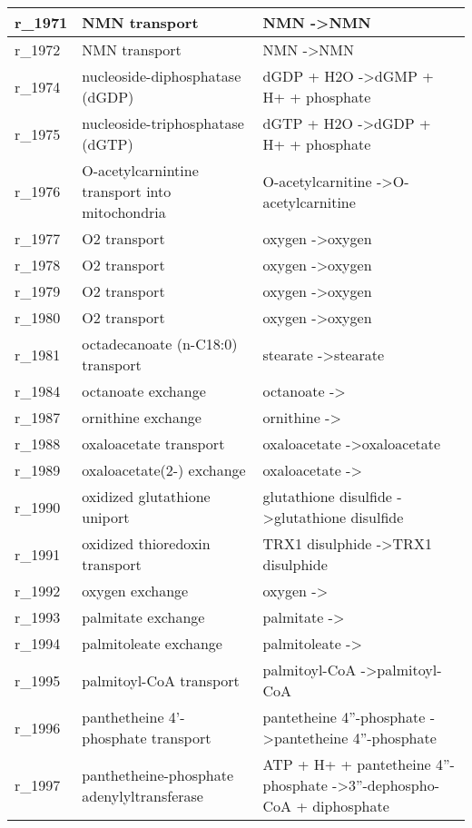 \begin{landscape}
{\begin{longtable}{|l|p{7cm}|p{15cm}|}
r\_1971 & NMN transport & NMN  -\textgreater NMN \\ \hline
r\_1972 & NMN transport & NMN  -\textgreater NMN \\ \hline
r\_1974 & nucleoside-diphosphatase (dGDP) & dGDP + H2O  -\textgreater dGMP + H+ + phosphate \\ \hline
r\_1975 & nucleoside-triphosphatase (dGTP) & dGTP + H2O  -\textgreater dGDP + H+ + phosphate \\ \hline
r\_1976 & O-acetylcarnintine transport into mitochondria & O-acetylcarnitine  -\textgreater O-acetylcarnitine \\ \hline
r\_1977 & O2 transport & oxygen  -\textgreater oxygen \\ \hline
r\_1978 & O2 transport & oxygen  -\textgreater oxygen \\ \hline
r\_1979 & O2 transport & oxygen  -\textgreater oxygen \\ \hline
r\_1980 & O2 transport & oxygen  -\textgreater oxygen \\ \hline
r\_1981 & octadecanoate (n-C18:0) transport & stearate  -\textgreater stearate \\ \hline
r\_1984 & octanoate exchange & octanoate  -\textgreater{} \\ \hline
r\_1987 & ornithine exchange & ornithine  -\textgreater{} \\ \hline
r\_1988 & oxaloacetate transport & oxaloacetate  -\textgreater oxaloacetate \\ \hline
r\_1989 & oxaloacetate(2-) exchange & oxaloacetate  -\textgreater{} \\ \hline
r\_1990 & oxidized glutathione uniport & glutathione disulfide  -\textgreater glutathione disulfide \\ \hline
r\_1991 & oxidized thioredoxin transport & TRX1 disulphide  -\textgreater TRX1 disulphide \\ \hline
r\_1992 & oxygen exchange & oxygen  -\textgreater{} \\ \hline
r\_1993 & palmitate exchange & palmitate  -\textgreater{} \\ \hline
r\_1994 & palmitoleate exchange & palmitoleate  -\textgreater{} \\ \hline
r\_1995 & palmitoyl-CoA transport & palmitoyl-CoA  -\textgreater palmitoyl-CoA \\ \hline
r\_1996 & panthetheine 4'-phosphate transport & pantetheine 4''-phosphate  -\textgreater pantetheine 4''-phosphate \\ \hline
r\_1997 & panthetheine-phosphate adenylyltransferase & ATP + H+ + pantetheine 4''-phosphate  -\textgreater 3''-dephospho-CoA + diphosphate \\ \hline

\end{longtable}}
\end{landscape}
